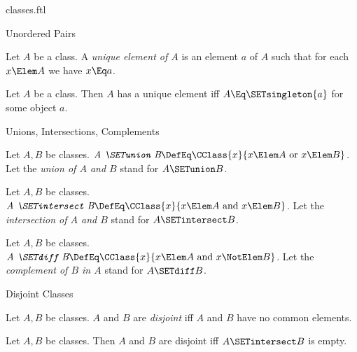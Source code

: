 \documentclass{stex}
\begin{document}
\begin{smodule}{classes.ftl}
\begin{sfragment}{Unordered Pairs}
  \begin{definition}[forthel,for=unique element]
    Let $A$ be a class.
    A \emph{unique element of $A$} is an element $a$ of $A$ such that for each $x \Elem A$ we have $x \Eq a$.
  \end{definition}

  \begin{proposition}[forthel]
    Let $A$ be a class.
    Then $A$ has a unique element iff $A \Eq \SETsingleton{a}$ for some object $a$.
  \end{proposition}
\end{sfragment}

\begin{sfragment}{Unions, Intersections, Complements}
  \begin{definition}[forthel,for={SETunion,union}]
    Let $A, B$ be classes.
    $\emph{A \SETunion B} \DefEq \CClass{x}{x \Elem A\text{ or }x \Elem B}$.
    Let the \emph{union of $A$ and $B$} stand for $A \SETunion B$.
  \end{definition}

  \begin{definition}[forthel,for={SETintersect,intersection}]
    Let $A, B$ be classes.
    $\emph{A \SETintersect B} \DefEq \CClass{x}{x \Elem A\text{ and }x \Elem B}$.
    Let the \emph{intersection of $A$ and $B$} stand for $A \SETintersect B$.
  \end{definition}

  \begin{definition}[forthel,for={SETdiff,complement}]
    Let $A, B$ be classes.
    $\emph{A \SETdiff B} \DefEq \CClass{x}{x \Elem A\text{ and }x \NotElem B}$.
    Let the \emph{complement of $B$ in $A$} stand for $A \SETdiff B$.
  \end{definition}
\end{sfragment}

\begin{sfragment}{Disjoint Classes}
  \begin{definition}[forthel,for=disjoint]
    Let $A, B$ be classes.
    $A$ and $B$ are \emph{disjoint} iff $A$ and $B$ have no common elements.
  \end{definition}

  \begin{proposition}[forthel]
    Let $A, B$ be classes.
    Then $A$ and $B$ are disjoint iff $A \SETintersect B$ is empty.
  \end{proposition}
\end{sfragment}
\end{smodule}
\end{document}
